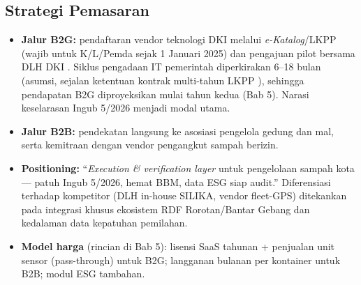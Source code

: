 \subsection{Strategi Pemasaran}
\label{sec:3-3}

\begin{itemize}[leftmargin=1.5cm]
  \item \textbf{Jalur B2G:} pendaftaran vendor teknologi DKI melalui \textit{e-Katalog}/LKPP (wajib untuk K/L/Pemda sejak 1 Januari 2025) dan pengajuan pilot bersama DLH DKI \parencite{lkpp2024}. Siklus pengadaan IT pemerintah diperkirakan 6--18 bulan (asumsi, sejalan ketentuan kontrak multi-tahun LKPP \parencite{lkpp2018}), sehingga pendapatan B2G diproyeksikan mulai tahun kedua (Bab 5). Narasi keselarasan Ingub 5/2026 menjadi modal utama.
  \item \textbf{Jalur B2B:} pendekatan langsung ke asosiasi pengelola gedung dan mal, serta kemitraan dengan vendor pengangkut sampah berizin.
  \item \textbf{Positioning:} ``\textit{Execution \& verification layer} untuk pengelolaan sampah kota --- patuh Ingub 5/2026, hemat BBM, data ESG siap audit.'' Diferensiasi terhadap kompetitor (DLH in-house SILIKA, vendor fleet-GPS) ditekankan pada integrasi khusus ekosistem RDF Rorotan/Bantar Gebang dan kedalaman data kepatuhan pemilahan.
  \item \textbf{Model harga} (rincian di Bab 5): lisensi SaaS tahunan + penjualan unit sensor (pass-through) untuk B2G; langganan bulanan per kontainer untuk B2B; modul ESG tambahan.
\end{itemize}
